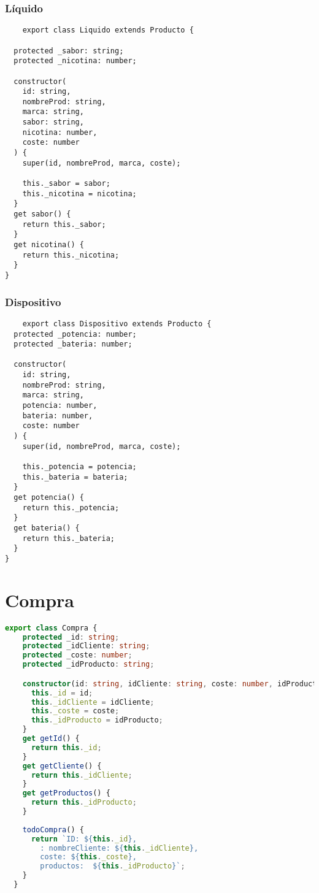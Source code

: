 \documentclass[a4paper]{article} %
\begin{document}
\subsubsection{Líquido}
\begin{lstlisting}
	export class Liquido extends Producto {

  protected _sabor: string;
  protected _nicotina: number;

  constructor(
    id: string,
    nombreProd: string,
    marca: string,
    sabor: string,
    nicotina: number,
    coste: number
  ) {
    super(id, nombreProd, marca, coste);

    this._sabor = sabor;
    this._nicotina = nicotina;
  }
  get sabor() {
    return this._sabor;
  }
  get nicotina() {
    return this._nicotina;
  }
}
\end{lstlisting}\clearpage
\subsubsection{Dispositivo}
\begin{lstlisting}
	export class Dispositivo extends Producto {
  protected _potencia: number;
  protected _bateria: number;

  constructor(
    id: string,
    nombreProd: string,
    marca: string,
    potencia: number,
    bateria: number,
    coste: number
  ) {
    super(id, nombreProd, marca, coste);

    this._potencia = potencia;
    this._bateria = bateria;
  }
  get potencia() {
    return this._potencia;
  }
  get bateria() {
    return this._bateria;
  }
}
\end{lstlisting}\clearpage
\section{Compra}
\begin{lstlisting}[language=Typescript]
	export class Compra {
    protected _id: string;
    protected _idCliente: string;
    protected _coste: number;
    protected _idProducto: string;

    constructor(id: string, idCliente: string, coste: number, idProducto: string) {
      this._id = id;
      this._idCliente = idCliente;
      this._coste = coste;
      this._idProducto = idProducto;
    }
    get getId() {
      return this._id;
    }
    get getCliente() {
      return this._idCliente;
    }
    get getProductos() {
      return this._idProducto;
    }
  
    todoCompra() {
      return `ID: ${this._id}, 
        : nombreCliente: ${this._idCliente}, 
        coste: ${this._coste},
        productos:  ${this._idProducto}`;
    }
  }
\end{lstlisting}\clearpage
\end{document}
